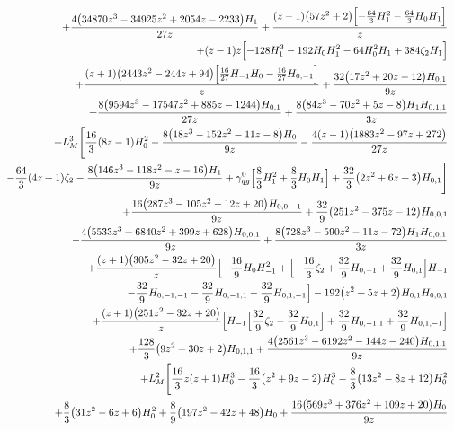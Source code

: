 \begin{eqnarray}
\nonumber \\ &&
+\frac{4 \big(34870 z^3-34925 z^2+2054 z-2233\big) H_1}{27 z}+\frac{(z-1)  \big(57 z^2+2\big) \Bigl[-\frac{64}{3}  H_1^2-\frac{64}{3}  H_0  H_1\Bigr]}{z}
\nonumber \\ &&
+(z-1) z \Bigl[-128  H_1^3-192  H_0 H_1^2-64 H_0^2 H_1+384  \zeta_2 H_1\Bigr]
\nonumber \\ &&
+\frac{(z+1) \big(2443 z^2-244  z+94\big) \Bigl[\frac{16}{27} H_{-1} H_0-\frac{16}{27}  H_{0,-1}\Bigr]}{z}+\frac{32  \big(17 z^2+20 z-12\big) H_{0,1}}{9  z}
\nonumber \\ &&
+\frac{8 \big(9594 z^3-17547 z^2+885 z-1244\big) H_{0,1}}{27 z}
+\frac{8 \big(84 z^3-70 z^2+5 z-8\big) H_1 H_{0,1,1}}{3 z}
\nonumber \\ &&
+L_M^3 
\Biggl[\frac{16}{3} (8 z-1) H_0^2-\frac{8  \big(18 z^3-152 z^2-11 z-8\big) H_0}{9 z}-\frac{4 (z-1) \big(1883 z^2-97  z+272\big)}{27 z}
\nonumber \\ &&
-\frac{64}{3} (4 z+1) \zeta_2-\frac{8 \big(146 z^3-118  z^2-z-16\big) H_1}{9 z}+{\gamma}_{qg}^{0} \Bigl[\frac{8}{3}H_1^2+\frac{8}{3} H_0 H_1\Bigr]
+\frac{32}{3} \big(2 z^2+6 z+3\big)H_{0,1}\Biggr]
\nonumber \\ &&
+\frac{16 \big(287 z^3-105 z^2-12 z+20\big) H_{0,0,-1}}{9  z}+\frac{32}{9}  \big(251 z^2-375 z-12\big) H_{0,0,1}
\nonumber \\ &&
-\frac{4  \big(5533 z^3+6840 z^2+399 z+628\big) H_{0,0,1}}{9 z}+\frac{8 \big(728  z^3-590 z^2-11 z-72\big) H_1 H_{0,0,1}}{3 z}
\nonumber \\ &&
+\frac{(z+1) \big(305 z^2-32 z+20\big) }{z}
\Bigl[-\frac{16}{9} H_0  H_{-1}^2+\Bigl[-\frac{16}{3} \zeta_2+\frac{32}{9} H_{0,-1}+\frac{32}{9}  H_{0,1}\Bigr] H_{-1}
\nonumber \\ &&
-\frac{32}{9} H_{0,-1,-1}-\frac{32}{9}  H_{0,-1,1}-\frac{32}{9} H_{0,1,-1}\Bigr]
-192 \big(z^2+5 z+2\big) H_{0,1}H_{0,0,1}
\nonumber \\ &&
+\frac{(z+1) \big(251 z^2-32  z+20\big) }{z}
\Bigl[H_{-1} \Bigl[\frac{32}{9}  \zeta_2
-\frac{32}{9}   H_{0,1}\Bigr]+\frac{32}{9}  H_{0,-1,1}
+\frac{32}{9}   H_{0,1,-1}\Bigr]
\nonumber \\ &&
+\frac{128}{3}  \big(9 z^2+30 z+2\big)H_{0,1,1}+\frac{4 \big(2561 z^3-6192 z^2-144 z-240\big) H_{0,1,1}}{9  z}
\nonumber \\ &&
+L_M^2 
\Biggl[\frac{16}{3}  z (z+1)H_0^3-\frac{16}{3} \big(z^2+9 z-2\big) H_0^3-\frac{8}{3} \big(13 z^2-8z+12\big) H_0^2
\nonumber \\ &&
+\frac{8}{3}  \big(31 z^2-6 z+6\big) H_0^2+\frac{8}{9} \big(197 z^2-42 z+48\big) H_0+\frac{16 \big(569 z^3+376 z^2+109  z+20\big) H_0}{9 z}

\end{eqnarray}
